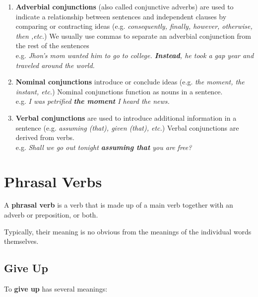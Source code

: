 \documentclass[hidelinks,10pt,a4paper]{article}
\begin{document}
\begin{enumerate}[label=(\alph*)]
	\item \textbf{Adverbial conjunctions} (also called conjunctive adverbs) are used to indicate a relationship between sentences and independent clauses by comparing or contracting ideas (e.g. \textit{consequently, finally, however, otherwise, then ,etc.}) We usually use commas to separate an adverbial conjunction from the rest of the sentences \\
		e.g. \textit{Jhon's mom wanted him to go to college. \textbf{Instead}, he took a gap year and traveled around the world. }
	\item \textbf{Nominal conjunctions} introduce or conclude ideas (e.g. \textit{the moment, the instant, etc.}) Nominal conjunctions function as nouns in a sentence. \\
		e.g. \textit{I was petrified \textbf{the moment} I heard the news.}
	\item \textbf{Verbal conjunctions} are used to introduce additional information in a sentence (e.g. \textit{assuming (that), given (that), etc.}) Verbal conjunctions are derived from verbs. \\
		e.g. \textit{Shall we go out tonight \textbf{assuming that} you are free? }
\end{enumerate}


\section{Phrasal Verbs}
A \textbf{phrasal verb} is a verb that is made up of a main verb together with an adverb or preposition, or both.

Typically, their meaning is no obvious from the meanings of the individual words themselves.

\subsection{Give Up}

To \textbf{give up} has several meanings:
\end{document}
